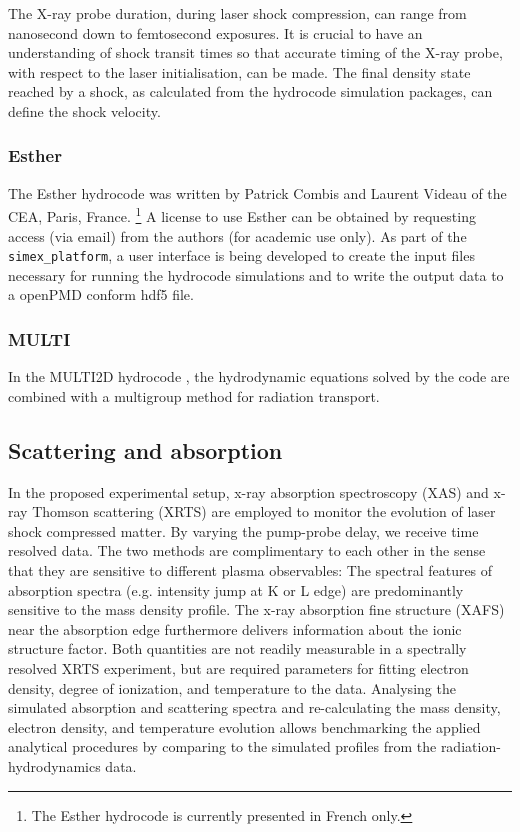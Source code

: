 \documentclass[a4paper]{article}
\begin{document}
The X-ray probe duration, during laser shock compression, can range from nanosecond down to femtosecond exposures.
It is crucial to have an understanding of shock transit times so that accurate timing of the X-ray probe,
with respect to the laser initialisation, can be made. The final density state reached by a shock, as calculated
from the hydrocode simulation packages, can define the shock velocity.

\subsubsection{Esther}
The Esther hydrocode was written by Patrick Combis and Laurent Videau of the CEA, Paris, France.
\footnote{The Esther hydrocode is currently presented in French only.}
A license to use Esther can be obtained by requesting access (via email) from the authors (for academic use only).
As part of the \texttt{simex\_platform}, a user interface is being developed to create the input files necessary for running
the hydrocode simulations and to write the output data to a openPMD conform hdf5 file.

\subsubsection{MULTI}
In the MULTI2D hydrocode \cite{Ramis2009},
the hydrodynamic equations solved by the code are combined with a multigroup method for radiation transport.

\subsection{Scattering and absorption\label{sec:long_pulse__scattering}}
In the proposed experimental setup, x-ray absorption spectroscopy (XAS) and x-ray Thomson scattering (XRTS) are employed to monitor
the evolution of laser shock compressed matter. By varying the pump-probe delay, we receive time resolved data. The two
methods are complimentary to each other in the sense that they are sensitive to different plasma observables: The spectral
features of absorption spectra (e.g. intensity jump at K or L edge)
are predominantly sensitive to the mass density profile. The x-ray absorption fine structure
(XAFS) near the absorption edge furthermore delivers information about the ionic structure factor. Both quantities are not
readily measurable in a spectrally resolved XRTS experiment, but are required parameters for fitting electron density,
degree of ionization, and temperature to the data. Analysing the simulated absorption and scattering spectra and
re-calculating the mass density, electron density, and temperature evolution allows benchmarking the applied analytical
procedures by comparing to the simulated profiles from the radiation-hydrodynamics data.
\end{document}
